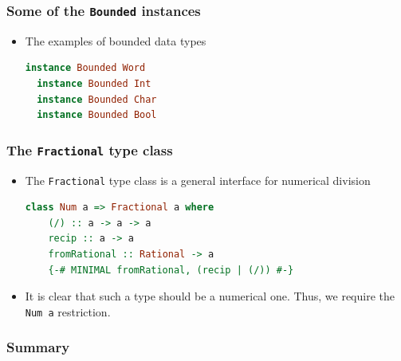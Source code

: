 \documentclass[10pt,pdf,utf8,russian,aspectratio=169]{beamer}
\begin{document}
\begin{frame}[fragile]
  \frametitle{Some of the \verb"Bounded" instances}
\begin{itemize}
  \item The examples of bounded data types
\begin{lstlisting}[language=Haskell]
  instance Bounded Word
  instance Bounded Int
  instance Bounded Char
  instance Bounded Bool
\end{lstlisting}
\end{itemize}
\end{frame}

\begin{frame}[fragile]
  \frametitle{The \verb"Fractional" type class}

\begin{itemize}
  \item The \verb"Fractional" type class is a general interface for numerical division
\begin{lstlisting}[language=Haskell]
  class Num a => Fractional a where
    (/) :: a -> a -> a
    recip :: a -> a
    fromRational :: Rational -> a
    {-# MINIMAL fromRational, (recip | (/)) #-}
  \end{lstlisting}
  \item It is clear that such a type should be a numerical one. Thus, we require the \verb"Num a" restriction.
\end{itemize}
\end{frame}

\begin{frame}
  \frametitle{Summary}
\end{frame}
\end{document}
